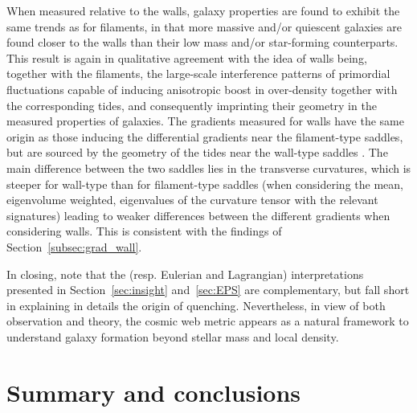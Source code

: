 \documentclass[useAMS,usenatbib]{mnras}
\begin{document}
When measured relative to the walls, galaxy properties are found to exhibit the same trends as for filaments, in that more massive and/or quiescent galaxies are found closer to the walls than their low mass and/or star-forming counterparts. This result is again in qualitative agreement with the idea of walls being, together with the filaments, the large-scale interference patterns of primordial fluctuations capable of inducing anisotropic boost in over-density together with the corresponding tides, and consequently imprinting their geometry in the measured properties of galaxies. The gradients measured for walls have the same origin as those inducing the differential gradients near the filament-type saddles, but are sourced by the geometry of the tides near the  wall-type saddles \citep[][Appendix~B]{Codis2015}. The main difference between the two saddles lies in the transverse curvatures, which is steeper for wall-type than for filament-type saddles (when considering the mean, eigenvolume weighted, eigenvalues of the curvature tensor with the relevant signatures) leading to weaker differences between the different gradients when considering walls.
This is consistent with the findings of Section~\ref{subsec:grad_wall}.

In closing, note that the (resp. Eulerian and Lagrangian) interpretations presented in Section~\ref{sec:insight} and~\ref{sec:EPS} are complementary, but fall short in explaining in details the origin of quenching. 
Nevertheless, in view of both observation and theory, the cosmic web metric appears  as a natural framework to understand  galaxy formation beyond stellar mass and local density.

\section{Summary and conclusions}
\label{sec:summary}
\end{document}
